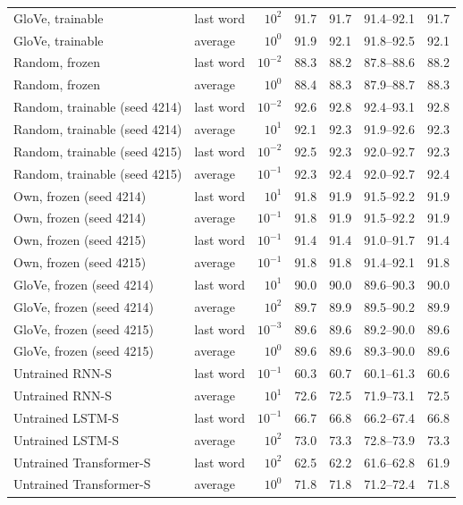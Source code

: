 \begin{tabular}{@{}llrrrrr@{}}
GloVe, trainable & last word & $10^{2}$ & 91.7 & 91.7 & 91.4--92.1 & 91.7 \\
GloVe, trainable & average & $10^{0}$ & 91.9 & 92.1 & 91.8--92.5 & 92.1 \\
Random, frozen & last word & $10^{-2}$ & 88.3 & 88.2 & 87.8--88.6 & 88.2 \\
Random, frozen & average & $10^{0}$ & 88.4 & 88.3 & 87.9--88.7 & 88.3 \\
Random, trainable (seed 4214) & last word & $10^{-2}$ & 92.6 & 92.8 & 92.4--93.1 & 92.8 \\
Random, trainable (seed 4214) & average & $10^{1}$ & 92.1 & 92.3 & 91.9--92.6 & 92.3 \\
Random, trainable (seed 4215) & last word & $10^{-2}$ & 92.5 & 92.3 & 92.0--92.7 & 92.3 \\
Random, trainable (seed 4215) & average & $10^{-1}$ & 92.3 & 92.4 & 92.0--92.7 & 92.4 \\
Own, frozen (seed 4214) & last word & $10^{1}$ & 91.8 & 91.9 & 91.5--92.2 & 91.9 \\
Own, frozen (seed 4214) & average & $10^{-1}$ & 91.8 & 91.9 & 91.5--92.2 & 91.9 \\
Own, frozen (seed 4215) & last word & $10^{-1}$ & 91.4 & 91.4 & 91.0--91.7 & 91.4 \\
Own, frozen (seed 4215) & average & $10^{-1}$ & 91.8 & 91.8 & 91.4--92.1 & 91.8 \\
GloVe, frozen (seed 4214) & last word & $10^{1}$ & 90.0 & 90.0 & 89.6--90.3 & 90.0 \\
GloVe, frozen (seed 4214) & average & $10^{2}$ & 89.7 & 89.9 & 89.5--90.2 & 89.9 \\
GloVe, frozen (seed 4215) & last word & $10^{-3}$ & 89.6 & 89.6 & 89.2--90.0 & 89.6 \\
GloVe, frozen (seed 4215) & average & $10^{0}$ & 89.6 & 89.6 & 89.3--90.0 & 89.6 \\
Untrained RNN-S & last word & $10^{-1}$ & 60.3 & 60.7 & 60.1--61.3 & 60.6 \\
Untrained RNN-S & average & $10^{1}$ & 72.6 & 72.5 & 71.9--73.1 & 72.5 \\
Untrained LSTM-S & last word & $10^{-1}$ & 66.7 & 66.8 & 66.2--67.4 & 66.8 \\
Untrained LSTM-S & average & $10^{2}$ & 73.0 & 73.3 & 72.8--73.9 & 73.3 \\
Untrained Transformer-S & last word & $10^{2}$ & 62.5 & 62.2 & 61.6--62.8 & 61.9 \\
Untrained Transformer-S & average & $10^{0}$ & 71.8 & 71.8 & 71.2--72.4 & 71.8 \\

\end{tabular}
